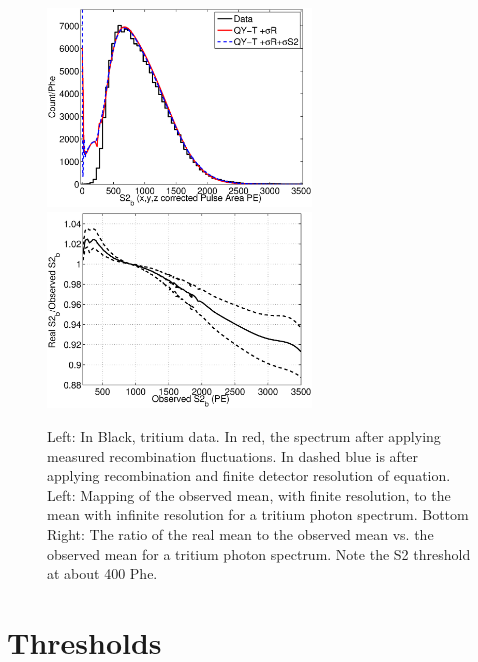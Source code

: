  \begin{figure}[h!]\centering
\includegraphics[width=70mm]{Chapter_Flucs/Figures/S1S2_Spectra/S2_spec_iter1_.eps}
\includegraphics[width=70mm]{Chapter_Flucs/Figures/S1S2_Spectra/S2_corr_iter1_.eps}
\caption{Left: In Black, tritium data. In red, the spectrum after applying measured recombination fluctuations. In dashed blue is after applying recombination and finite detector resolution of equation. Left: Mapping of the observed mean, with finite resolution, to the mean with infinite resolution for a tritium photon spectrum. Bottom Right: The ratio of the real mean to the observed mean vs. the observed mean for a tritium photon spectrum. Note the S2 threshold at about 400  Phe. }
\label{fig:S2_mapping_2}
\end{figure}

\newpage

\section{Thresholds}

